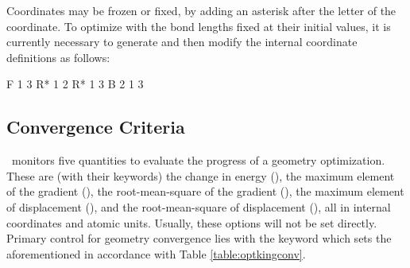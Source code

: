 Coordinates may be frozen or fixed, by adding an asterisk after the letter of the coordinate.
To optimize with the bond lengths fixed at their initial values, it is currently necessary to
generate and then modify the internal coordinate definitions as follows:
\begin{Snippet}
F 1 3
R*     1     2
R*     1     3
B      2     1     3
\end{Snippet}

\subsection{Convergence Criteria}

\PSIoptking\ monitors five quantities to evaluate the progress of a geometry 
optimization. These are (with their keywords) the change in energy 
(), the maximum element of 
the gradient (), the root-mean-square 
of the gradient (), the maximum element
of displacement (), and the 
root-mean-square of displacement (), 
all in internal coordinates and atomic units. Usually, these options will not 
be set directly. Primary control for geometry convergence lies with the keyword 
 which sets the aforementioned in accordance 
with Table \ref{table:optkingconv}.

